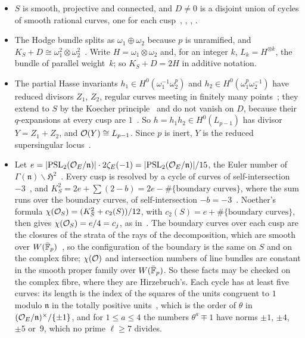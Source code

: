 \begin{itemize}
\item[(G1)] $S$ is smooth, projective and connected, and $D\ne0$ is a disjoint union of cycles of smooth rational curves,
one for each cusp~\cite[Theorem~5.1, Proposition~5.2 and Corollary~5.3]{Rapoport1978},
\cite{Chai1990}, \cite[Section~7]{Dimitrov2004}, \cite[Theorems~6.4.1.1 and~7.3.3.4]{Lan2013}.
\item[(G2)] The Hodge bundle splits as $\omega_1\oplus\omega_2$ because $p$ is unramified, and
$K_S+D\cong\omega_1^2\otimes\omega_2^2$~\cite[Theorem~6.4.1.1(4)]{Lan2013}. Write $H=\omega_1\otimes\omega_2$ and, for an
integer $k$, $L_k=H^{\otimes k}$, the bundle of parallel weight~$k$; so $K_S+D=2H$ in additive notation.
\item[(G3)] The partial Hasse invariants $h_1\in H^0(\omega_1^{-1}\omega_2^p)$ and $h_2\in H^0(\omega_1^p\omega_2^{-1})$
have reduced divisors $Z_1$, $Z_2$, regular curves meeting in finitely many
points~\cite[Section~1 and Theorem~2.1(1)]{Goren2001}; they extend to $S$ by the Koecher
principle~\cite[Theorem~8.3]{Dimitrov2004} and do not vanish on $D$, because their $q$-expansions at every cusp are
$1$~\cite[Theorem~2.1(2)]{Goren2001}. So $h=h_1h_2\in H^0(L_{p-1})$ has divisor $Y=Z_1+Z_2$, and $\mathcal{O}(Y)\cong L_{p-1}$.
Since $p$ is inert, $Y$ is the reduced supersingular locus~\cite[Proposition~4.1]{BachmatGoren1999}.
\item[(G4)] Let $e=\lvert \operatorname{PSL}_2(\mathcal{O}_E/\mathfrak n) \rvert\cdot2\zeta_E(-1)=\lvert \operatorname{PSL}_2(\mathcal{O}_E/\mathfrak n) \rvert/15$, the Euler
number of $\Gamma(\mathfrak n)\backslash\mathfrak H^2$~\cite[Sections~1.6 and~1.7]{Hirzebruch1973}. Every cusp is resolved
by a cycle of curves of self-intersection $-3$~\cite[Sections~2.5 and~2.6]{Hirzebruch1973}, and
$K_S^2=2e+\sum(2-b)=2e-\#\{\text{boundary curves}\}$, where the sum runs over the boundary curves, of self-intersection
$-b=-3$~\cite[Sections~3.2 and~3.6]{Hirzebruch1973}. Noether's formula $\chi(\mathcal{O}_S)=(K_S^2+c_2(S))/12$, with
$c_2(S)=e+\#\{\text{boundary curves}\}$, then gives $\chi(\mathcal{O}_S)=e/4=c_j$, as in~\cite[Section~6.2, (G4)]{Luck2026}. The
boundary curves over each cusp are the closures of the strata of the rays of the decomposition, which are smooth over
$W(\bar{\mathbb{F}}_p)$~\cite[Theorem~6.4.1.1(2) and~(3)]{Lan2013}, so the configuration of the boundary is the same on $S$ and on the
complex fibre; $\chi(\mathcal{O})$ and intersection numbers of line bundles are constant in the smooth proper family over
$W(\bar{\mathbb{F}}_p)$. So these facts may be checked on the complex fibre, where they are Hirzebruch's. Each cycle has at least five
curves: its length is the index of the squares of the units congruent to $1$ modulo $\mathfrak n$ in the totally positive
units~\cite[Section~6.2, (G4)]{Luck2026}, which is the order of $\theta$ in $(\mathcal{O}_E/\mathfrak n)^\times/\{\pm1\}$, and for
$1\le a\le4$ the numbers $\theta^a\mp1$ have norms $\pm1$, $\pm4$, $\pm5$ or~$9$, which no prime $\ell\ge7$ divides.
\end{itemize}

